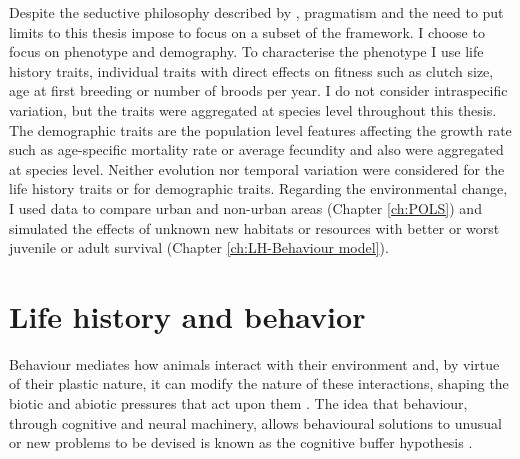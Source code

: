 Despite the seductive philosophy described by \citet{levins1985}, pragmatism and
the need to put limits to this thesis impose to focus on a subset of the
framework. I choose to focus on phenotype and demography.
To characterise the phenotype I use life history traits, individual traits
with direct effects on fitness such as clutch size, age at first breeding or
number of broods per year. I do not consider intraspecific variation, but the
traits were aggregated at species level throughout this thesis.
The demographic traits are the population level features affecting
the growth rate such as age-specific mortality rate or average fecundity and
also were aggregated at species level. Neither evolution nor temporal variation
were considered for the life history traits or for demographic traits.
Regarding the environmental change, I used data to compare urban and non-urban
areas (Chapter \ref{ch:POLS}) and simulated the effects of unknown new
habitats or resources with better or worst juvenile or adult survival (Chapter
\ref{ch:LH-Behaviour model}).


\section{Life history and behavior}

Behaviour mediates how animals interact with their environment and, by virtue
of their plastic nature, it can modify the nature of these interactions, shaping
the biotic and abiotic pressures that act upon them
\citep{Futuyma1988,Losos2004,Lapiedra2013}. The idea that behaviour, through
cognitive and neural machinery, allows behavioural solutions to unusual or new
problems to be devised is known as the cognitive buffer hypothesis
\citep{Allman1993,VanSchaik2003,Sol2009,Sol2009a}.


